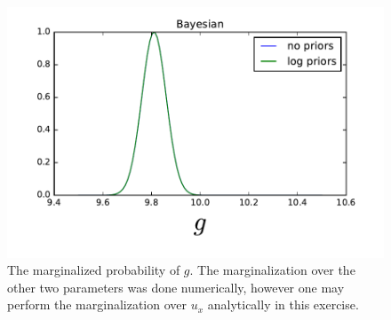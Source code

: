 \documentclass[12pt,a4paper]{article}
\begin{document}
\begin{figure}[ht]
  \centering
  \includegraphics[keepaspectratio]{g_bayesian.pdf}
  \caption{The marginalized probability of $g$. The marginalization
    over the other two parameters was done numerically, however
    one may perform the marginalization over $u_x$ analytically in
    this exercise.}
  \label{fig:g_bayesian}
\end{figure}
\end{document}
